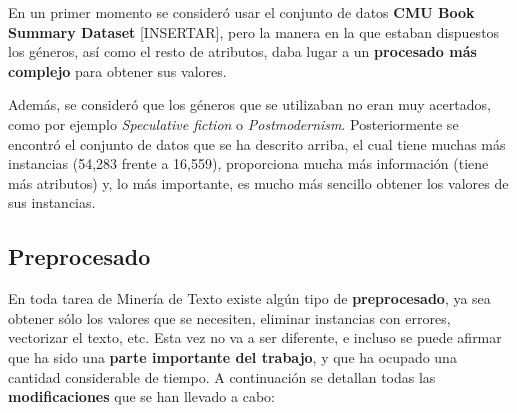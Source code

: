 \documentclass[12pt,a4paper, xcolor=table]{article}
\begin{document}
    \vspace{3mm}

    En un primer momento se consideró usar el conjunto de datos \textbf{CMU Book Summary Dataset} [INSERTAR], pero la manera en la que estaban dispuestos los géneros, así como el resto de atributos, daba lugar a un \textbf{procesado más complejo} para obtener sus valores.

    \vspace{1mm}

    Además, se consideró que los géneros que se utilizaban no eran muy acertados, como por ejemplo \textit{Speculative fiction} o \textit{Postmodernism}. Posteriormente se encontró el conjunto de datos que se ha descrito arriba, el cual tiene muchas más instancias (54,283 frente a 16,559), proporciona mucha más información (tiene más atributos) y, lo más importante, es mucho más sencillo obtener los valores de sus instancias.

    \subsection{Preprocesado}
        En toda tarea de Minería de Texto existe algún tipo de \textbf{preprocesado}, ya sea obtener sólo los valores que se necesiten, eliminar instancias con errores, vectorizar el texto, etc. Esta vez no va a ser diferente, e incluso se puede afirmar que ha sido una \textbf{parte importante del trabajo}, y que ha ocupado una cantidad considerable de tiempo. A continuación se detallan todas las \textbf{modificaciones} que se han llevado a cabo:
\end{document}
